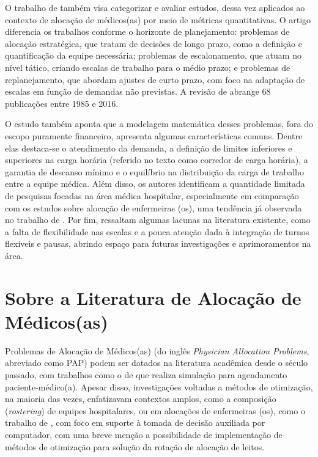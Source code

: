 O trabalho de  também visa categorizar e avaliar estudos, dessa vez aplicados ao contexto de alocação de médicos(as) por meio de métricas quantitativas. O artigo diferencia os trabalhos conforme o horizonte de planejamento: problemas de alocação estratégica, que tratam de decisões de longo prazo, como a definição e quantificação da equipe necessária; problemas de escalonamento, que atuam no nível tático, criando escalas de trabalho para o médio prazo; e problemas de replanejamento, que abordam ajustes de curto prazo, com foco na adaptação de escalas em função de demandas não previstas. A revisão de  abrange 68 publicações entre 1985 e 2016.

O estudo também aponta que a modelagem matemática desses problemas, fora do escopo puramente financeiro, apresenta algumas características comuns. Dentre elas destaca-se o atendimento da demanda, a definição de limites inferiores e superiores na carga horária (referido no texto como corredor de carga horária), a garantia de descanso mínimo e o equilíbrio na distribuição da carga de trabalho entre a equipe médica. Além disso, os autores identificam a quantidade limitada de pesquisas focadas na área médica hospitalar, especialmente em comparação com os estudos sobre alocação de enfermeiras (os), uma tendência já observada no trabalho de . Por fim,  ressaltam algumas lacunas na literatura existente, como a falta de flexibilidade nas escalas e a pouca atenção dada à integração de turnos flexíveis e pausas, abrindo espaço para futuras investigações e aprimoramentos na área.

\section{Sobre a Literatura de Alocação de Médicos(as)}
\label{2rev-sec1}

Problemas de Alocação de Médicos(as) (do inglês \textit{Physician Allocation Problems}, abreviado como PAP) podem ser datados na literatura acadêmica desde o século passado, com trabalhos como o de  que realiza simulação para agendamento paciente-médico(a). Apesar disso, investigações voltadas a métodos de otimização, na maioria das vezes, enfatizavam contextos amplos, como a composição (\textit{rostering}) de equipes hospitalares, ou em alocações de enfermeiras (os), como o trabalho de , com foco em suporte à tomada de decisão auxiliada por computador, com uma breve menção a possibilidade de implementação de métodos de otimização para solução da rotação de alocação de leitos.

